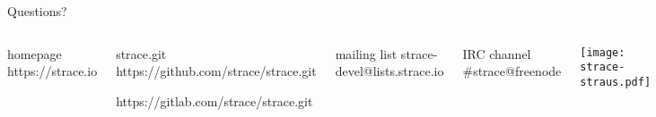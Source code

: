 \documentclass[unicode,aspectratio=169]{beamer}
\begin{document}
{
\begin{frame}{Questions?}
	\begin{columns}
		\column{7cm}
\begin{block}{\large homepage}
	https://strace.io
\end{block}
\begin{block}{\large strace.git}
	https://github.com/strace/strace.git

	https://gitlab.com/strace/strace.git
\end{block}
\begin{block}{\large mailing list}
	strace-devel@lists.strace.io
\end{block}
\begin{block}{\large IRC channel}
	\#strace@freenode
\end{block}
		\column{3cm}
			\centerline{\texttt{[image: strace-straus.pdf]}}
	\end{columns}
\end{frame}
}
\end{document}
